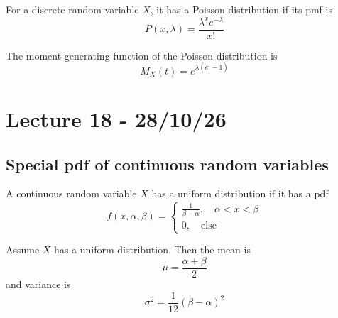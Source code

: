 \documentclass[11pt]{article}
\begin{document}
\begin{definition}
    For a discrete random variable $X$, it has a Poisson distribution if its pmf is 
    \[
        P(x,\lambda) = \frac{\lambda^x e^{-\lambda}}{x!}
    \]
    
\end{definition}

\begin{theorem}
    The moment generating function of the Poisson distribution is
    \[
        M_X(t) = e^{\lambda(e^t - 1)}     
    \]
    
\end{theorem}

\section{Lecture 18 - 28/10/26}
\subsection{Special pdf of continuous random variables}
\begin{definition}
    A continuous random variable $X$ has a uniform distribution if it has a pdf
    \[
        f(x,\alpha, \beta) = 
        \begin{cases}
            \frac{1}{\beta - \alpha}, \quad \alpha < x < \beta \\
             0, \quad \text{else}
        \end{cases}
    \]
    

\end{definition}
\begin{theorem}
    Assume $X$ has a uniform distribution. Then the mean is 
    \[
        \mu = \frac{\alpha + \beta}{2}
    \]
    and variance is
    \[
        \sigma^2 = \frac{1}{12} (\beta - \alpha)^2
    \]
        
\end{theorem}
\end{document}
